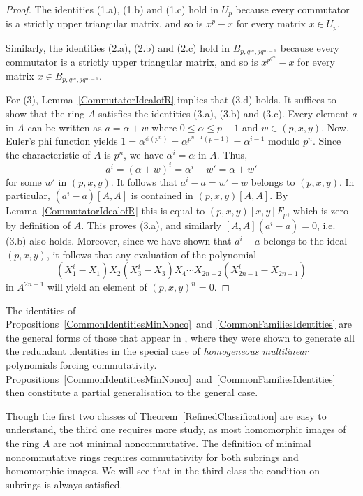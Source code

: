 \documentclass[11pt]{article}
\theoremstyle{definition}
\begin{document}
\begin{proof}
The identities (1.a), (1.b) and (1.c) hold in $U_p$ because every commutator is a strictly upper triangular matrix, and so is $x^p-x$ for every matrix $x\in U_p$.

Similarly, the identities (2.a), (2.b) and (2.c) hold in $B_{p,q^m,jq^{m-1}}$ because every commutator is a strictly upper triangular matrix, and so is $x^{p^{q^m}}-x$ for every matrix $x\in B_{p,q^m,jq^{m-1}}$.

For (3), Lemma~\ref{CommutatorIdealofR} implies that (3.d) holds. It suffices to show that the ring $A$ satisfies the identities (3.a), (3.b) and (3.c). Every element $a$ in $A$ can be written as $a=\alpha + w$ where $0\leq \alpha\leq p-1$ and $w\in (p,x,y)$. Now, Euler's phi function yields $1=\alpha^{\phi(p^n)}=\alpha^{p^{n-1}(p-1)}=\alpha^{i-1}$ modulo $p^n$. Since the characteristic of $A$ is $p^n$, we have $\alpha^i=\alpha$ in $A$. Thus,
\[a^i=(\alpha+w)^i=\alpha^i+w'=\alpha+w'\]
for some $w'$ in $(p,x,y)$. It follows that $a^i-a=w'-w$ belongs to $(p,x,y)$. In particular, $(a^i-a)[A,A]$ is contained in $(p,x,y)[A,A]$. By Lemma~\ref{CommutatorIdealofR} this is equal to $(p,x,y)[x,y]F_p$, which is zero by definition of $A$. This proves (3.a), and similarly $[A,A](a^i-a)=0$, i.e. (3.b) also holds. Moreover, since we have shown that $a^i-a$ belongs to the ideal $(p,x,y)$, it follows that any evaluation of the polynomial
\[\left(X_1^i-X_1\right)X_2\left(X_3^i-X_3\right)X_4\cdots X_{2n-2}\left(X_{2n-1}^i-X_{2n-1}\right)\]
in $A^{2n-1}$ will yield an element of $(p,x,y)^n=0$.
\end{proof}

The identities of Propositions~\ref{CommonIdentitiesMinNonco}~and~\ref{CommonFamiliesIdentities} are the general forms of those that appear in \cite[Proposition~5.2]{BellandDanchev}, where they were shown to generate all the redundant identities in the special case of \textit{homogeneous multilinear} polynomials forcing commutativity. Propositions~\ref{CommonIdentitiesMinNonco}~and~\ref{CommonFamiliesIdentities} then constitute a partial generalisation to the general case.

Though the first two classes of Theorem~\ref{RefinedClassification} are easy to understand, the third one requires more study, as most homomorphic images of the ring $A$ are not minimal noncommutative. The definition of minimal noncommutative rings requires commutativity for both subrings and homomorphic images. We will see that in the third class the condition on subrings is always satisfied.
\end{document}
